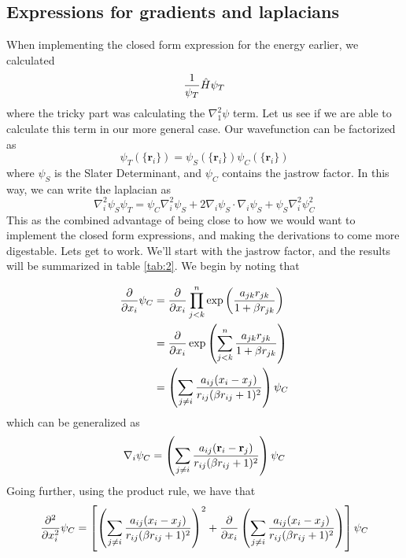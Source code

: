 \documentclass[aps,prc,twocolumn,floatfix]{revtex4}
\def\rvec{\textbf{r}}
\begin{document}
\begin{appendices}
 \section{Expressions for gradients and laplacians}
 \label{sec:gradlap}
 When implementing the closed form expression for the energy earlier, we calculated 
\begin{equation}
 {1 \over \psi_T} \hat{H} \psi_T
\end{equation}
where the tricky part was calculating the $\nabla^2_1\psi$ term. Let us see if we are able to calculate this term in our more general case. Our wavefunction can be factorized as 
\begin{equation}
 \psi_T(\{ \rvec_i \}) = \psi_S(\{ \rvec_i \})\psi_C(\{\rvec_i \})
\end{equation}
where $\psi_S$ is the Slater Determinant, and $\psi_C$ contains the jastrow factor. In this way, we can write the laplacian as 
\begin{equation}
 \nabla_i^2 \psi_S \psi_T = \psi_C \nabla_i^2 \psi_S + 2 \nabla_i \psi_S \cdot \nabla_i \psi_S + \psi_S \nabla_i^2 \psi_C^2
\end{equation}
This as the combined advantage of being close to how we would want to implement the closed form expressions, and making the derivations to come more digestable. Lets get to work. We'll start with the jastrow factor, and the results will be summarized in table \ref{tab:2}. We begin by noting that
\begin{widetext}
\begin{align}
 {\partial \over \partial x_i} \psi_C & =  {\partial \over \partial x_i}\prod_{j<k}^n \exp\left( { a_{jk} r_{jk} \over 1 + \beta r_{jk}} \right) \\
 & =  {\partial \over \partial x_i} \exp \left( \sum_{j<k}^n { a_{jk} r_{jk} \over 1 + \beta r_{jk}}\right) \\
 & = \left( \sum_{j \ne i} { a_{ij}(x_i - x_j) \over r_{ij}(\beta r_{ij} + 1)^2} \right) \psi_C
\end{align}
which can be generalized as 
\begin{equation}
 \nabla_i \psi_C = \left( \sum_{j \ne i} { a_{ij}(\rvec_i - \rvec_j) \over r_{ij}(\beta r_{ij} + 1)^2} \right) \psi_C
\end{equation}
Going further, using the product rule, we have that 
\begin{align}
 {\partial^2 \over \partial x_i^2} \psi_C & = \left[ \left( \sum_{j \ne i} { a_{ij}(x_i - x_j) \over r_{ij}(\beta r_{ij} + 1)^2} \right)^2  + {\partial \over \partial x_i} \left( \sum_{j \ne i} { a_{ij}(x_i - x_j) \over r_{ij}(\beta r_{ij} + 1)^2} \right)   \right] \psi_C \\

\end{align}
\end{widetext}
\end{appendices}
\end{document}
